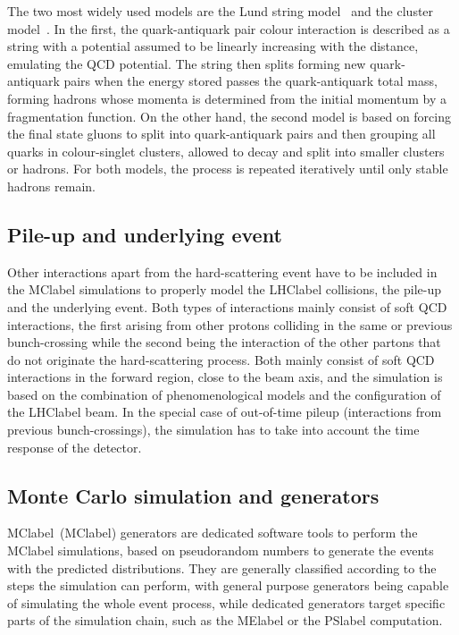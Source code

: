 The two most widely used models are the Lund string model~\cite{ANDERSSON198331} and the cluster model~\cite{Winter2004}.
In the first, the quark-antiquark pair colour interaction is described as a string with a potential assumed to be linearly increasing with the distance, emulating the \acrshort{QCD} potential. The string then splits forming new quark-antiquark pairs when the energy stored passes the quark-antiquark total mass, forming hadrons whose momenta is determined from the initial momentum by a fragmentation function. On the other hand, the second model is based on forcing the final state gluons to split into quark-antiquark pairs and then grouping all quarks in colour-singlet clusters, allowed to decay and split into smaller clusters or hadrons. For both models, the process is repeated iteratively until only stable hadrons remain.

\subsection{Pile-up and underlying event}

Other interactions apart from the hard-scattering event have to be included in the \acrshort{MClabel} simulations to properly model the \acrshort{LHClabel} collisions, the pile-up and the underlying event. Both types of interactions mainly consist of soft \acrshort{QCD} interactions, the first arising from other protons colliding in the same or previous bunch-crossing while the second being the interaction of the other partons that do not originate the hard-scattering process. Both mainly consist of soft \acrshort{QCD} interactions in the forward region, close to the beam axis, and the simulation is based on the combination of phenomenological models and the configuration of the \acrshort{LHClabel} beam. In the special case of out-of-time pileup (interactions from previous bunch-crossings), the simulation has to take into account the time response of the detector.

\subsection{Monte Carlo simulation and generators}
\label{subsec:MCsimulation}
\acrlong{MClabel}~(\acrshort{MClabel}) generators are dedicated software tools to perform the \acrshort{MClabel} simulations, based on pseudorandom numbers to generate the events with the predicted distributions. They are generally classified according to the steps the simulation can perform, with general purpose generators being capable of simulating the whole event process, while dedicated generators target specific parts of the simulation chain, such as the \acrshort{MElabel} or the \acrshort{PSlabel} computation.\\


